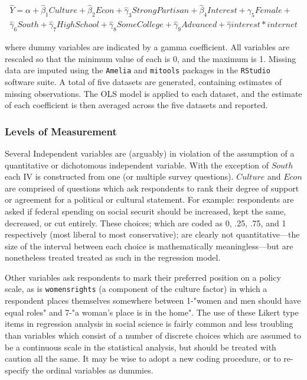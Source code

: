 \documentclass[12pt]{article}
\begin{document}
\begin{equation}
\begin{split}
\hat{Y} = \alpha + \hat{\beta}_1{\mathit{Culture}} + \hat{\beta}_2\mathit{Econ} + \hat{\gamma}_3\mathit{Strong Partisan} +  \hat{\beta}_4\mathit{Interest} +  \gamma_5\mathit{Female} + \\ \hat{\gamma}_6\mathit{South} + \hat{\gamma}_7\mathit{High School} + \hat{\gamma}_8\mathit{Some College} + \hat{\gamma}_9\mathit{Advanced} + \hat{\gamma}\mathit{interest}*\mathit{internet}
\end{split}
\end{equation}

\noindent where dummy variables are indicated by a gamma coefficient. All variables are rescaled so that the minimum value of each is 0, and the maximum is 1. Missing data are imputed using the 
\texttt{Amelia} and \texttt{mitools} packages in the \texttt{RStudio} software suite. A total of five datasets are generated, containing estimates of missing observations. The OLS model is applied to each dataset, and the estimate of each coefficient is then averaged across the five datasets and reported.

\subsubsection{Levels of Measurement}

Several Independent variables are (arguably) in violation of the assumption of a quantitative or dichotomous independent variable. With the exception of $\mathit{South}$ each IV is constructed from one (or multiple survey questions). $\mathit{Culture}$ and $\mathit{Econ}$ are comprised of questions which ask respondents to rank their degree of support or agreement  for a political or cultural statement. For example: respondents are asked if federal spending on social securit should be increased, kept the same, decreased, or cut entirely. These choices; which are coded as 0, .25, .75, and 1 respectively (most liberal to most conservative); are clearly not quantitative---the size of the interval between each choice is mathematically meaningless---but are nonetheless treated treated as such in the regression model. 

Other variables ask respondents to mark their preferred position on a policy scale, as is \texttt{womensrights} (a component of the culture factor) in which a respondent places themselves somewhere between 1-"women and men should have equal roles" and 7-"a woman's place is in the home". The use of these Likert type items in regression analysis in social science is fairly common and less troubling than variables which consist of a number of discrete choices which are assumed to be a continuous scale in the statistical analysis, but should be treated with caution all the same. It may be wise to adopt a new coding procedure, or to re-specify the ordinal variables as dummies.
\end{document}
